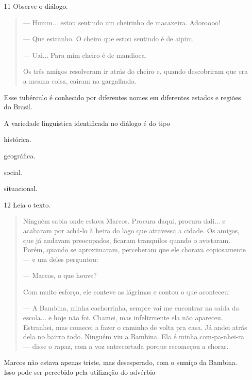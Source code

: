 \num{11} Observe o diálogo.

\begin{quote}
--- Humm... estou sentindo um cheirinho de macaxeira. Adoroooo!

--- Que estranho. O cheiro que estou sentindo é de aipim.

--- Uai... Para mim cheiro é de mandioca.

Os três amigos resolveram ir atrás do cheiro e, quando descobriram que
era a mesma coisa, caíram na gargalhada.
\end{quote}

Esse tubérculo é conhecido por diferentes nomes em diferentes
estados e regiões do Brasil.

A variedade linguística identificada no diálogo é do tipo

\begin{escolha}
\item histórica.

\item geográfica.

\item social.

\item situacional.
\end{escolha}

\num{12} Leia o texto.

\begin{quote}
Ninguém sabia onde estava Marcos. Procura daqui, procura dali... e
acabaram por achá-lo à beira do lago que atravessa a cidade. Os amigos,
que já andavam preocupados, ficaram tranquilos quando o avistaram.
Porém, quando se aproximaram, perceberam que ele chorava copiosamente
--- e um deles perguntou:

--- Marcos, o que houve?

Com muito esforço, ele conteve as lágrimas e contou o que aconteceu:

--- A Bambina, minha cachorrinha, sempre vai me encontrar na saída da
escola... e hoje não foi. Chamei, mas infelizmente ela não apareceu.
Estranhei, mas comecei a fazer o caminho de volta pra casa. Já andei
atrás dela no bairro todo. Ninguém viu a Bambina. Ela é minha
com-pa-nhei-ra --- disse o rapaz, com a voz entrecortada porque
recomeçou a chorar.

\end{quote}

Marcos não estava apenas triste, mas desesperado, com o sumiço da
Bambina. Isso pode ser percebido pela utilização do advérbio

